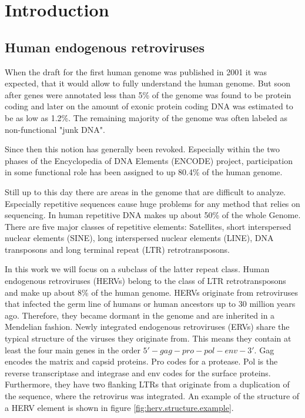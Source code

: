 \documentclass[a4paper,12pt,twoside,openright]{article}
\let\oldsection\section
\def\section{\cleardoublepage\oldsection}
\begin{document}
\newpage


\tableofcontents
\newpage

\pagestyle{plain}
\section{Introduction} 
\label{Introduction}

\subsection{Human endogenous retroviruses}
\label{Introduction:Human endogenous retroviruses}

When the draft for the first human genome was published in 2001\cite{Venter1304} it was expected, that it would allow to fully understand the human genome. But soon after genes were annotated less than 5\% of the genome was found to be protein coding\cite{Consortium2001} and later on the amount of exonic protein coding DNA was estimated to be as low as 1.2\%\cite{Encode2012}. The remaining majority of the genome was often labeled as non-functional "junk DNA"\cite{Pennisi1159}. 

Since then this notion has generally been revoked. Especially within the two phases of the Encyclopedia of DNA Elements (ENCODE) project\cite{Encode2012}, participation in some functional role has been assigned to up 80.4\% of the human genome. 

Still up to this day there are areas in the genome that are difficult to analyze. Especially repetitive sequences cause huge problems for any method that relies on sequencing\cite{Treangen2011}. In human repetitive DNA makes up about 50\% of the whole Genome\cite{Treangen2011}. There are five major classes of repetitive elements: Satellites, short interspersed nuclear elements (SINE), long interspersed nuclear elements (LINE), DNA transposons and long terminal repeat (LTR) retrotransposons. 

In this work we will focus on a subclass of the latter repeat class. Human endogenous retroviruses (HERVs) belong to the class of LTR retrotransposons and make up about 8\% of the human genome\cite{APM:APM12476}. HERVs originate from retroviruses that infected the germ line of humans or human ancestors up to 30 million years ago\cite{10.1146/annurev.genom.7.080505.115700}. Therefore, they became dormant in the genome and are inherited in a Mendelian fashion. Newly integrated endogenous retroviruses (ERVs) share the typical structure of the viruses they originate from. This means they contain at least the four main genes in the order $5'-gag-pro-pol-env-3'$. Gag encodes the matrix and capsid proteins. Pro codes for a protease. Pol is the reverse transcriptase and integrase and env codes for the surface proteins. Furthermore, they have two flanking LTRs that originate from a duplication of the sequence, where the retrovirus was integrated\cite{10.1146/annurev.genom.7.080505.115700}. An example of the structure of a HERV element is shown in figure \ref{fig:herv.structure.example}.
\end{document}

